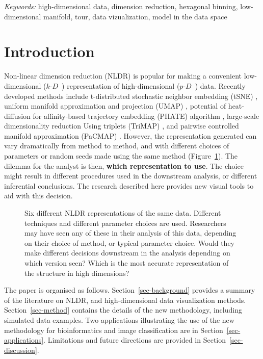 \documentclass[
  12pt]{article}
\newcommand\pD{$p\text{-}D$\ }
\newcommand\kD{$k\text{-}D$\ }
\begin{document}
\noindent%
{\it Keywords:} high-dimensional data, dimension reduction, hexagonal
binning, low-dimensional manifold, tour, data vizualization, model in
the data space
\vfill

\newpage
{} %

\section{Introduction}\label{introduction}

Non-linear dimension reduction (NLDR) is popular for making a convenient
low-dimensional (\kD) representation of high-dimensional (\pD) data.
Recently developed methods include t-distributed stochastic neighbor
embedding (tSNE) \citep{laurens2008}, uniform manifold approximation and
projection (UMAP) \citep{leland2018}, potential of heat-diffusion for
affinity-based trajectory embedding (PHATE) algorithm \citep{moon2019},
large-scale dimensionality reduction Using triplets (TriMAP)
\citep{amid2022}, and pairwise controlled manifold approximation
(PaCMAP) \citep{yingfan2021}. However, the representation generated can
vary dramatically from method to method, and with different choices of
parameters or random seeds made using the same method
(Figure~\ref{fig-NLDR-variety}). The dilemma for the analyst is then,
\textbf{which representation to use}. The choice might result in
different procedures used in the downstream analysis, or different
inferential conclusions. The research described here provides new visual
tools to aid with this decision.

\begin{figure}


\caption{\label{fig-NLDR-variety}Six different NLDR representations of
the same data. Different techniques and different parameter choices are
used. Researchers may have seen any of these in their analysis of this
data, depending on their choice of method, or typical parameter choice.
Would they make different decisions downstream in the analysis depending
on which version seen? Which is the most accurate representation of the
structure in high dimensions?}

\end{figure}%

The paper is organised as follows. Section~\ref{sec-background} provides
a summary of the literature on NLDR, and high-dimensional data
visualization methods. Section~\ref{sec-method} contains the details of
the new methodology, including simulated data examples. Two applications
illustrating the use of the new methodology for bioinformatics and image
classification are in Section~\ref{sec-applications}. Limitations and
future directions are provided in Section~\ref{sec-discussion}.
\end{document}
